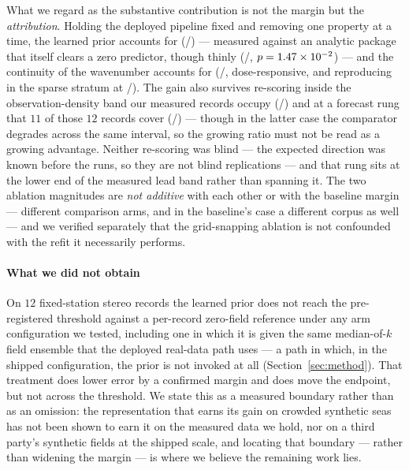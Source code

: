 \documentclass[review]{elsarticle}
\begin{document}
What we regard as the substantive contribution is not the margin but the
\emph{attribution}. Holding the deployed pipeline fixed and removing one property at
a time, the learned prior accounts for \BTwentyTwoRel{}
(\BTwentyTwoBetter{}/\BTwentyTwoN{}) --- measured against an analytic package that itself
clears a zero predictor, though thinly (\BTwentyTwoAnaShipZero{}/\BTwentyTwoN{}, $p = 1.47\times 10^{-2}{}$)
--- and the continuity of the wavenumber accounts for \BSixteenRel{}
(\BSixteenBetter{}/\BSixteenN{}, dose-responsive, and reproducing in the sparse
stratum at \BNineteenBetter{}/\BNineteenN{}). The gain also survives
re-scoring inside the observation-density band our measured records occupy
(\MTenBetter{}/\MTenN{}) and at a forecast rung that $11$ of those $12$ records cover (\TFourBetter{}/\TFourN{}) --- though in the latter case the comparator
degrades across the same interval, so the growing ratio must not be read as a
growing advantage.
Neither re-scoring was blind --- the expected direction was known before the runs,
so they are not blind replications --- and that rung sits at the lower end of the
measured lead band rather than spanning it. The two ablation magnitudes are \emph{not
additive} with each other or with the baseline margin --- different comparison arms,
and in the baseline's case a different corpus as well --- and we verified separately that the grid-snapping
ablation is not confounded with the refit it necessarily performs.

\paragraph{What we did not obtain}
On $12$ fixed-station stereo records the learned prior does not reach the
pre-registered threshold against a per-record zero-field reference under any arm
configuration we tested, including one in which it is given the same median-of-$k$
field ensemble that the deployed real-data path uses --- a path in which, in the
shipped configuration, the prior is not invoked at all
(Section~\ref{sec:method}). That treatment does lower
error by a confirmed margin and does move the endpoint, but not across the
threshold. We state this as a measured boundary rather than as an omission: the
representation that earns its gain on crowded synthetic seas has not been shown to
earn it on the measured data we hold, nor on a third party's synthetic fields at the
shipped scale, and locating that boundary --- rather than widening the margin --- is
where we believe the remaining work lies.
\end{document}
